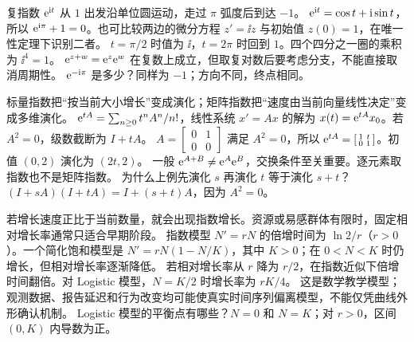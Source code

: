 \idea 复指数 $\mathrm e^{\mathrm i t}$ 从 $1$ 出发沿单位圆运动，走过 $\pi$ 弧度后到达 $-1$。
\mathpart $\mathrm e^{\mathrm i t}=\cos t+\mathrm i\sin t$，所以 $\mathrm e^{\mathrm i\pi}+1=0$。也可比较两边的微分方程 $z'=\ii z$ 与初始值 $z(0)=1$，在唯一性定理下识别二者。
\examplepart $t=\pi/2$ 时值为 $\ii$，$t=2\pi$ 时回到 $1$。四个四分之一圈的乘积为 $\ii^4=1$。
\pitfall $\mathrm e^{z+w}=\mathrm e^z\mathrm e^w$ 在复数上成立，但取复对数后要考虑分支，不能直接取消周期性。
\exercise $\mathrm e^{-\mathrm i\pi}$ 是多少？同样为 $-1$；方向不同，终点相同。
\nextlesson

\idea 标量指数把“按当前大小增长”变成演化；矩阵指数把“速度由当前向量线性决定”变成多维演化。
\mathpart $\mathrm e^{tA}=\sum_{n\ge0}t^nA^n/n!$，线性系统 $x'=Ax$ 的解为 $x(t)=\mathrm e^{tA}x_0$。若 $A^2=0$，级数截断为 $I+tA$。
\examplepart $A=\left[\begin{smallmatrix}0&1\\0&0\end{smallmatrix}\right]$ 满足 $A^2=0$，所以 $\mathrm e^{tA}=\left[\begin{smallmatrix}1&t\\0&1\end{smallmatrix}\right]$。初值 $(0,2)$ 演化为 $(2t,2)$。
\pitfall 一般 $\mathrm e^{A+B}\ne\mathrm e^A\mathrm e^B$，交换条件至关重要。逐元素取指数也不是矩阵指数。
\exercise 为什么上例先演化 $s$ 再演化 $t$ 等于演化 $s+t$？$(I+sA)(I+tA)=I+(s+t)A$，因为 $A^2=0$。
\nextlesson

\idea 若增长速度正比于当前数量，就会出现指数增长。资源或易感群体有限时，固定相对增长率通常只适合早期阶段。
\mathpart 指数模型 $N'=rN$ 的倍增时间为 $\ln2/r$（$r>0$）。一个简化饱和模型是 $N'=rN(1-N/K)$，其中 $K>0$；在 $0<N<K$ 时仍增长，但相对增长率逐渐降低。
\examplepart 若相对增长率从 $r$ 降为 $r/2$，在指数近似下倍增时间翻倍。对 Logistic 模型，$N=K/2$ 时增长率为 $rK/4$。
\pitfall 这是数学教学模型；观测数据、报告延迟和行为改变均可能使真实时间序列偏离模型，不能仅凭曲线外形确认机制。
\exercise Logistic 模型的平衡点有哪些？$N=0$ 和 $N=K$；对 $r>0$，区间 $(0,K)$ 内导数为正。
